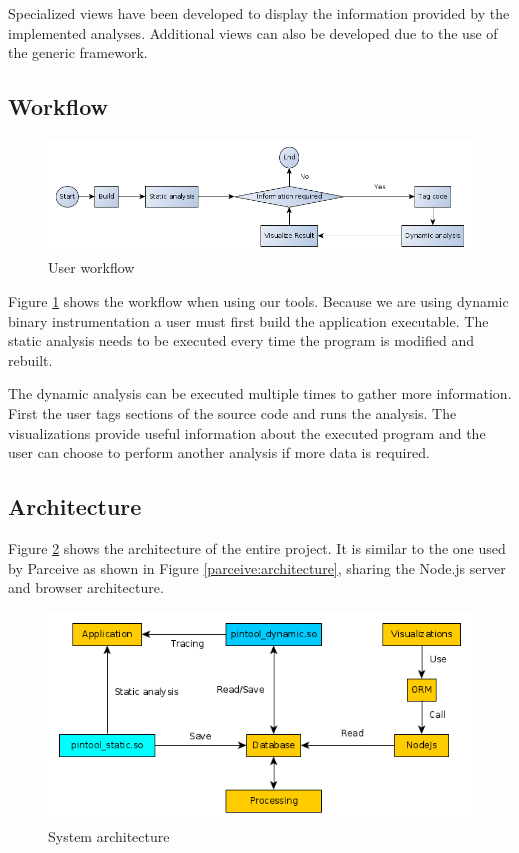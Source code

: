 Specialized views have been developed to display the information provided by the implemented analyses. Additional views can also be developed due to the use of the generic framework.

\subsection{Workflow}

\begin{figure}
	\centering
	\includegraphics[width=1\textwidth]{workflow}
	\caption{User workflow}
	\label{cap3:workflow}
\end{figure}

Figure \ref{cap3:workflow} shows the workflow when using our tools.  Because we are using dynamic binary instrumentation a user must first build the application executable. The static analysis needs to be executed every time the program is modified and rebuilt.

The dynamic analysis can be executed multiple times to gather more information. First the user tags sections of the source code and runs the analysis. The visualizations provide useful information about the executed program and the user can choose to perform another analysis if more data is required.

\subsection{Architecture}

Figure \ref{architecture} shows the architecture of the entire project. It is similar to the one used by Parceive as shown in Figure \ref{parceive:architecture}, sharing the Node.js server and browser architecture.

\begin{figure}
	\centering
	\includegraphics[width=1\textwidth]{architecture}
	\caption{System architecture}
	\label{architecture}
\end{figure}

